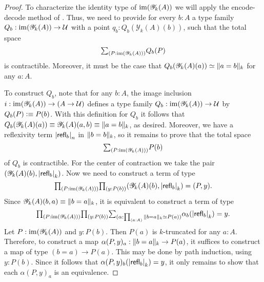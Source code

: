 \begin{proof}
To characterize the identity type of $\im(\mathscr{Y}_k(A))$ we will apply
the encode-decode method of \cite{LicataShulman}. Thus, we need to provide for every $b:A$ a type 
family $Q_b:\im(\mathscr{Y}_k(A))\to\UU$ with a point $q_b:Q_b(\mathscr{Y}_k(A)(b))$,
such that the total space
\begin{equation*}
\sm{P:\im(\mathscr{Y}_k(A))} Q_b(P)
\end{equation*}
is contractible. Moreover, it must be the case that $\eqv{Q_b(\mathscr{Y}_k(A)(a))}{\trunc{k}{a=b}}$ for any $a:A$. 

To construct $Q_b$, note that for any $b:A$, the image inclusion $i:\im(\mathscr{Y}_k(A))\to (A\to\UU)$ defines 
a type family $Q_b:\im(\mathscr{Y}_k(A))\to\UU$ by $Q_b(P)\defeq P(b)$. With this definition for $Q_b$ it follows that $Q_b(\mathscr{Y}_k(A)(a))\jdeq\mathscr{Y}_k(A)(a,b)\jdeq\trunc{k}{a=b}$, as desired. Moreover, we have a reflexivity term $\tproj{n}{\refl{b}}$ in $\trunc{k}{b=b}$, so it remains to prove that the total space 
\begin{equation*}
\sm{P:\im(\mathscr{Y}_k(A))}P(b)
\end{equation*}
of $Q_b$ is contractible. For the center of contraction we take the pair
$\pairr{\mathscr{Y}_k(A)(b),\tproj{k}{\refl{b}}}$.
Now we need to construct a term of type
\begin{equation*}
\prd{P:\im(\mathscr{Y}_k(A))}{y:P(b)} \pairr{\mathscr{Y}_k(A)(b),\tproj{k}{\refl{b}}}=\pairr{P,y}.
\end{equation*}
Since $\mathscr{Y}_k(A)(b,a)\jdeq\trunc{k}{b=a}$, it is equivalent to construct a term of type
\begin{equation*}
\prd{P:\im(\mathscr{Y}_k(A))}{y:P(b)}\sm{\alpha:\prd{a:A} \eqv{\trunc{k}{b=a}}{P(a)}} \alpha_b(\tproj{k}{\refl{b}})=y.
\end{equation*}
Let $P:\im(\mathscr{Y}_k(A))$ and $y:P(b)$. Then $P(a)$ is $k$-truncated for any $a:A$. Therefore, to construct a map
$\alpha(P,y)_a:\trunc{k}{b=a}\to P(a)$, it suffices to construct a map of type $(b=a)\to P(a)$. This may be done by
path induction, using $y:P(b)$. Since it follows that $\alpha(P,y)_b(\tproj{k}{\refl{b}})=y$, it only remains to show that each $\alpha(P,y)_a$ is an equivalence.  


\end{proof}
